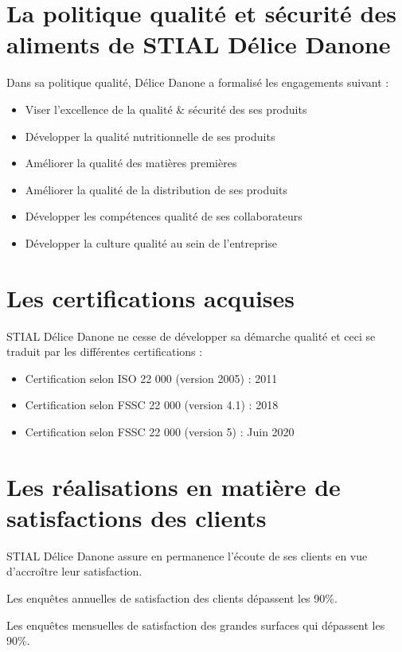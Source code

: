 \begin{spacing}{1.2}
\section{La politique qualité et sécurité des aliments  de  STIAL Délice Danone}
Dans sa politique qualité, Délice Danone a formalisé les engagements suivant :
\begin{itemize}

\item Viser l'excellence de la qualité \& sécurité des ses produits
\item Développer la qualité nutritionnelle de ses produits
\item Améliorer la qualité des matières premières
\item Améliorer la qualité de la distribution de ses produits
\item Développer les compétences qualité de ses collaborateurs
\item Développer la culture qualité au sein de l’entreprise
\end{itemize}

\section{ Les certifications acquises }
 STIAL Délice Danone ne cesse de développer sa démarche qualité et ceci se traduit par les différentes certifications :

 \begin{itemize}

 \item Certification selon ISO 22 000 (version 2005) : 2011

 \item Certification selon FSSC 22 000 (version 4.1) : 2018

 \item Certification selon FSSC 22 000 (version 5) : Juin 2020
 \end{itemize}
 \section{Les réalisations en matière de satisfactions des clients }
 STIAL Délice Danone assure en permanence l’écoute de ses clients en vue d'accroître leur satisfaction.


Les enquêtes annuelles de satisfaction des clients  dépassent les 90\%.


Les enquêtes mensuelles de satisfaction des grandes surfaces qui dépassent les 90\%.



\end{spacing}
